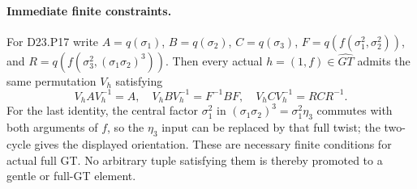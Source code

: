 \paragraph{Immediate finite constraints.}
For D23.P17 write $A=q(\sigma_1)$, $B=q(\sigma_2)$,
$C=q(\sigma_3)$, $F=q(f(\sigma_1^2,\sigma_2^2))$,
and $R=q(f(\sigma_3^2,(\sigma_1\sigma_2)^3))$.
Then every actual $h=(1,f)\in\widehat{GT}$ admits the same
permutation $V_h$ satisfying
\[
 V_h A V_h^{-1}=A,\quad
 V_h B V_h^{-1}=F^{-1}BF,\quad
 V_h C V_h^{-1}=RCR^{-1}.
\]
For the last identity, the central factor $\sigma_1^2$
in $(\sigma_1\sigma_2)^3=\sigma_1^2\eta_3$ commutes with
both arguments of $f$, so the $\eta_3$ input can be replaced
by that full twist; the two-cycle gives the displayed
orientation. These are necessary finite conditions for actual
full GT. No arbitrary tuple satisfying them is thereby
promoted to a gentle or full-GT element.
